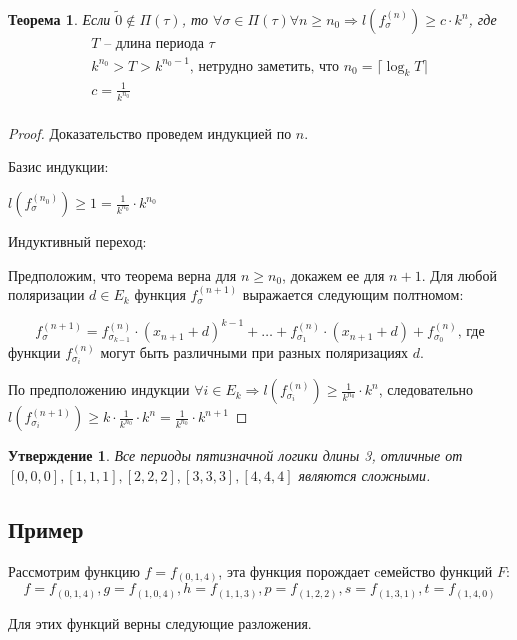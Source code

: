 \documentclass[bibliography=totoc, a4paper, 14pt]{extarticle}
\newtheorem{myth}{Теорема}
\newtheorem*{myst}{Утверждение}
\begin{document}
\begin{myth}
\label{th2}
Если $\tilde{0} \not\in \Pi(\tau)$, то $\forall \sigma \in \Pi(\tau) \forall n \geqslant n_0 \Rightarrow 
l(f_{\sigma}^{(n)}) \geqslant c \cdot k^n$, где
$$
\begin{array}{l}
T \text{ -- длина периода }\tau \\
k^{n_0} > T > k^{n_0 - 1} \text{, нетрудно заметить, что } n_0 = \lceil \log_kT \rceil \\
c = \frac{1}{k^{n_0}} \\
\end{array}
$$
\end{myth}
\begin{proof}
Доказательство проведем индукцией по $n$.

Базис индукции:

$l(f_{\sigma}^{(n_0)}) \geqslant 1 = \frac{1}{k^{n_0}} \cdot k^{n_0}$

Индуктивный переход:

Предположим, что теорема верна для $n \geqslant n_0$, докажем ее для $n+1$.
Для любой поляризации $d \in E_k$ функция $f_{\sigma}^{(n+1)}$ выражается следующим полтномом:

$$f_{\sigma}^{(n+1)} = f_{\sigma_{k-1}}^{(n)}\cdot(x_{n+1}+d)^{k-1} + \ldots +
f_{\sigma_1}^{(n)}\cdot(x_{n+1}+d) + f^{(n)}_{\sigma_0} \text{, где} $$
функции $f_{\sigma_i}^{(n)}$ могут быть различными при разных поляризациях $d$.


По предположению индукции $\forall i \in E_k \Rightarrow l(f_{\sigma_i}^{(n)}) \geqslant
\frac{1}{k^{n_0}} \cdot k^n$, следовательно $l(f_{\sigma_i}^{(n+1)}) \geqslant
k \cdot \frac{1}{k^{n_0}} \cdot k^n = \frac{1}{k^{n_0}} \cdot k^{n+1}$
\end{proof}

\begin{myst} Все периоды пятизначной логики длины 3, отличные от $[0,0,0], [1,1,1],
[2,2,2], [3,3,3], [4,4,4]$ являются сложными.
\end{myst}

\subsection{Пример}
Рассмотрим функцию $f=f_{(0,1,4)}$, эта функция порождает cемейство функций $F$:
$$
f=f_{(0,1,4)}, g=f_{(1,0,4)}, h=f_{(1,1,3)}, p=f_{(1,2,2)}, s=f_{(1,3,1)}, t=f_{(1,4,0)}
$$

Для этих функций верны следующие разложения.
\end{document}
